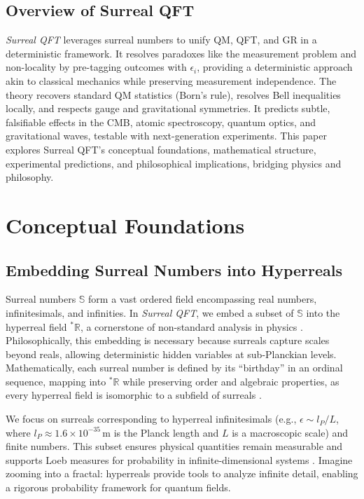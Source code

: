 \documentclass{article}
\begin{document}
\subsection{Overview of Surreal QFT}
\textit{Surreal QFT} leverages surreal numbers to unify QM, QFT, and GR in a deterministic framework. It resolves paradoxes like the measurement problem and non-locality by pre-tagging outcomes with \(\epsilon_i\), providing a deterministic approach akin to classical mechanics while preserving measurement independence. The theory recovers standard QM statistics (Born's rule), resolves Bell inequalities locally, and respects gauge and gravitational symmetries. It predicts subtle, falsifiable effects in the CMB, atomic spectroscopy, quantum optics, and gravitational waves, testable with next-generation experiments. This paper explores Surreal QFT's conceptual foundations, mathematical structure, experimental predictions, and philosophical implications, bridging physics and philosophy.

\section{Conceptual Foundations}
\subsection{Embedding Surreal Numbers into Hyperreals}
Surreal numbers \(\mathbb{S}\) form a vast ordered field encompassing real numbers, infinitesimals, and infinities. In \textit{Surreal QFT}, we embed a subset of \(\mathbb{S}\) into the hyperreal field \({}^*\mathbb{R}\), a cornerstone of non-standard analysis in physics \cite{Goldblatt1998}. Philosophically, this embedding is necessary because surreals capture scales beyond reals, allowing deterministic hidden variables at sub-Planckian levels. Mathematically, each surreal number is defined by its ``birthday'' in an ordinal sequence, mapping into \({}^*\mathbb{R}\) while preserving order and algebraic properties, as every hyperreal field is isomorphic to a subfield of surreals \cite{Ehrlich2012}.

We focus on surreals corresponding to hyperreal infinitesimals (e.g., \(\epsilon \sim l_P / L\), where \(l_P \approx 1.6 \times 10^{-35} \, \text{m}\) is the Planck length and \(L\) is a macroscopic scale) and finite numbers. This subset ensures physical quantities remain measurable and supports Loeb measures for probability in infinite-dimensional systems \cite{Albeverio1986}. Imagine zooming into a fractal: hyperreals provide tools to analyze infinite detail, enabling a rigorous probability framework for quantum fields.
\end{document}
